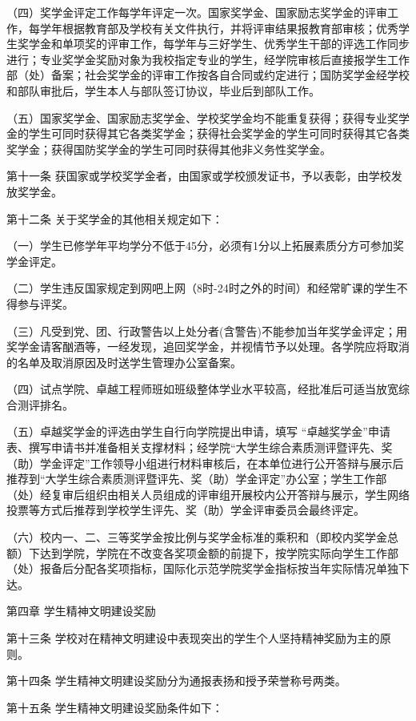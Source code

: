 \documentclass[UTF8,12pt,a4paper]{report}
\begin{document}
（四）奖学金评定工作每学年评定一次。国家奖学金、国家励志奖学金的评审工作，每学年根据教育部及学校有关文件执行，并将评审结果报教育部审核；优秀学生奖学金和单项奖的评审工作，每学年与三好学生、优秀学生干部的评选工作同步进行；专业奖学金奖励对象为我校指定专业的学生，经学院审核后直接报学生工作部（处）备案；社会奖学金的评审工作按各自合同或约定进行；国防奖学金经学校和部队审批后，学生本人与部队签订协议，毕业后到部队工作。

（五）国家奖学金、国家励志奖学金、学校奖学金均不能重复获得；获得专业奖学金的学生可同时获得其它各类奖学金；获得社会奖学金的学生可同时获得其它各类奖学金；获得国防奖学金的学生可同时获得其他非义务性奖学金。

第十一条  获国家或学校奖学金者，由国家或学校颁发证书，予以表彰，由学校发放奖学金。

第十二条  关于奖学金的其他相关规定如下：

（一）学生已修学年平均学分不低于45分，必须有1分以上拓展素质分方可参加奖学金评定。

（二）学生违反国家规定到网吧上网（8时-24时之外的时间）和经常旷课的学生不得参与评奖。

（三）凡受到党、团、行政警告以上处分者(含警告)不能参加当年奖学金评定；用奖学金请客酗酒等，一经发现，追回奖学金，并视情节予以处理。各学院应将取消的名单及取消原因及时送学生管理办公室备案。

（四）试点学院、卓越工程师班如班级整体学业水平较高，经批准后可适当放宽综合测评排名。

（五）卓越奖学金的评选由学生自行向学院提出申请，填写 “卓越奖学金”申请表、撰写申请书并准备相关支撑材料；经学院“大学生综合素质测评暨评先、奖（助）学金评定”工作领导小组进行材料审核后，在本单位进行公开答辩与展示后推荐到“大学生综合素质测评暨评先、奖（助）学金评定”办公室；学生工作部（处）经复审后组织由相关人员组成的评审组开展校内公开答辩与展示，学生网络投票等方式后推荐到学校学生评先、奖（助）学金评审委员会最终评定。

（六）校内一、二、三等奖学金按比例与奖学金标准的乘积和（即校内奖学金总额）下达到学院，学院在不改变各奖项金额的前提下，按学院实际向学生工作部（处）报备后分配各奖项指标，国际化示范学院奖学金指标按当年实际情况单独下达。



第四章  学生精神文明建设奖励

第十三条  学校对在精神文明建设中表现突出的学生个人坚持精神奖励为主的原则。

第十四条  学生精神文明建设奖励分为通报表扬和授予荣誉称号两类。

第十五条  学生精神文明建设奖励条件如下：
\end{document}
